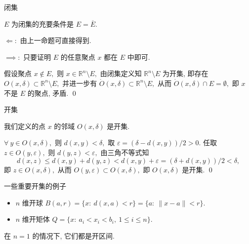 
\begin{frame}{闭集}

\begin{prop}
$E$ 为闭集的充要条件是 $E = \overline{E}.$
\end{prop}

\pause
\vspace{1em}

\startproof[bg=yellow, fg=red]
\vspace{0.5em}

$\Longleftarrow:$ 由上一命题可直接得到.

\pause
\vspace{0.5em}

$\implies:$ 只要证明 $E$ 的任意聚点 $x$ 都在 $E$ 中即可.

\pause

假设聚点 $x \not\in E,$ 则 $x \in \mathbb{R}^n \setminus E,$ 由闭集定义知 $\mathbb{R}^n \setminus E$ 为开集, 即存在 $O(x, \delta) \subset \mathbb{R}^n \setminus E,$ 并进一步有 $\mathring{O}(x, \delta) \subset \mathbb{R}^n \setminus E,$ 从而 $\mathring{O}(x, \delta) \cap E = \emptyset,$ 即 $x$ 不是 $E$ 的聚点, 矛盾.
\qed

\end{frame}


\begin{frame}{开集}

\begin{prop}
我们定义的点 $x$ 的邻域 $O(x, \delta)$ 是开集.
\end{prop}

\pause

\startproof[bg=yellow, fg=red]
$\forall~y \in O(x, \delta),$ 则 $d(x, y) < \delta,$ 取 $\varepsilon = (\delta - d(x, y)) / 2 > 0.$ 任取 $z \in O(y, \varepsilon),$ 则 $d(y, z) < \varepsilon,$ 由三角不等式知
\[d(x, z) \leqslant d(x, y) + d(y, z) < d(x, y) + \varepsilon = (\delta + d(x, y)) / 2 < \delta,\]
即 $z \in O(x, \delta),$ 从而 $O(y, \varepsilon) \subset O(x, \delta),$ 即 $O(x, \delta)$ 是开集.
\qed



\pause

\begin{block}{一些重要开集的例子}
\begin{itemize}
\item $n$ 维开球 $B(a, r) = \{ x: ~ d(x, a) < r \} = \{ a: ~ \lVert x - a \rVert < r \}.$
\pause
\item $n$ 维开矩体 $Q = \{ x: ~ a_i < x_i < b_i, ~ 1 \leqslant i \leqslant n \}.$
\end{itemize}
\pause
在 $n = 1$ 的情况下, 它们都是开区间.
\end{block}

\end{frame}

